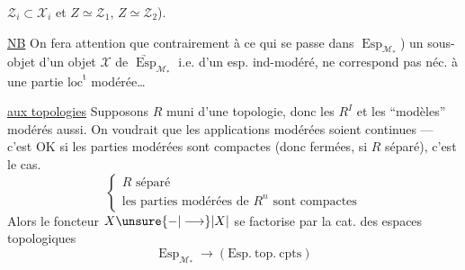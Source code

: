 $\mathcal Z_i\subset\mathcal X_i$ et $Z\simeq\mathcal Z_1$, $Z\simeq\mathcal Z_2$).

\uline{NB} On fera attention que contrairement à ce qui se passe dans $\operatorname{Esp}_{\mathcal M_*}$) un sous-objet d'un objet $\mathcal X$ de $\underrightarrow{\operatorname{Esp}}_{\mathcal M_*}$ i.e. d'un esp. ind-modéré, ne correspond pas néc. à une partie $\mathrm{loc}^{\mathrm t}$ modérée\ldots

\uline{ aux topologies} Supposons $R$ muni d'une topologie, donc les $R^I$ et les ``modèles'' modérés aussi. On voudrait que les applications modérées soient continues --- c'est OK si les parties modérées sont compactes (donc fermées, si $R$ séparé), c'est le cas.  
\[
 \left\{\begin{array}{l}R\text{ séparé}\\
 \text{les parties modérées de }R^n\text{ sont compactes}
 \end{array}\right.
\]
Alors le foncteur $X\unsure{-|\longrightarrow}|X|$ se factorise par la cat. des espaces topologiques
\[
 \operatorname{Esp}_{\mathcal M_*}\longrightarrow(\mathrm{Esp.\ top.\ cpts})
\]
